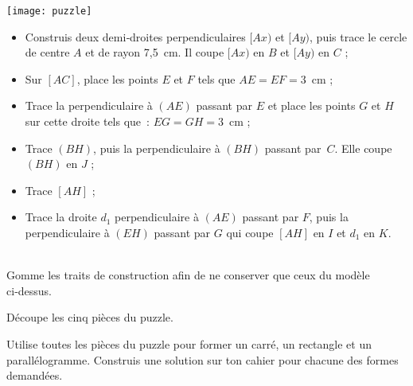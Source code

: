 \begin{activite}

\begin{minipage}[c]{0.3\linewidth}
\texttt{[image: puzzle]}
\end{minipage} \hfill%
\begin{minipage}[c]{0.56\linewidth}
 \begin{partie}
  \begin{itemize}
   \item Construis deux demi‑droites perpendiculaires $[Ax)$ et $[Ay)$, puis trace le cercle de centre $A$ et de rayon 7,5 cm. Il coupe $[Ax)$ en $B$ et $[Ay)$ en $C$ ;
   \item Sur $[AC]$, place les points $E$ et $F$ tels que $AE = EF = 3$ cm ;
   \item Trace la perpendiculaire à $(AE)$ passant par $E$ et place les points $G$ et $H$ sur cette droite tels que : $EG = GH = 3$ cm ;
   \item Trace $(BH)$, puis la perpendiculaire à $(BH)$ passant par $C$. Elle coupe $(BH)$ en $J$ ;
   \item Trace $[AH]$ ;
   \item Trace la droite $d_1$ perpendiculaire à $(AE)$ passant par $F$, puis la perpendiculaire à $(EH)$ passant par $G$ qui coupe $[AH]$ en $I$ et $d_1$ en $K$.
   \end{itemize}

 \end{partie}
\end{minipage} \\

Gomme les traits de construction afin de ne conserver que ceux du modèle ci‑dessus.
   
Découpe les cinq pièces du puzzle. 

\begin{partie}
Utilise toutes les pièces du puzzle pour former un carré, un rectangle et un parallélogramme. Construis une solution sur ton cahier pour chacune des formes demandées.
 \end{partie}
 
\end{activite}
